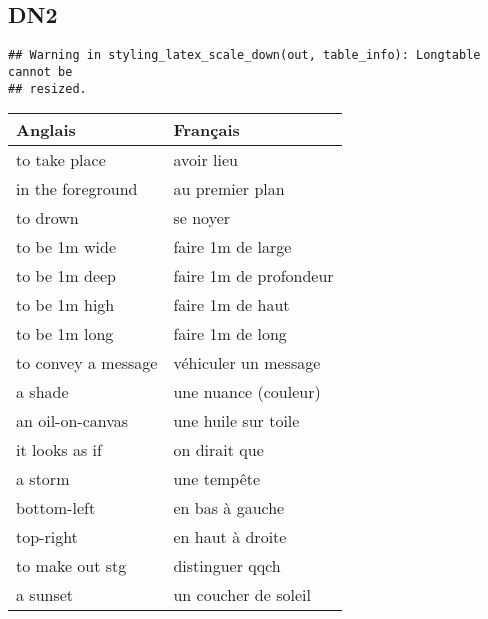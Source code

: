 \documentclass[
  10pt,
]{article}
\begin{document}
\hypertarget{dn2}{%
\subsection{DN2}\label{dn2}}

\begin{verbatim}
## Warning in styling_latex_scale_down(out, table_info): Longtable cannot be
## resized.
\end{verbatim}

\begin{longtable}{ll}
\toprule
Anglais &  Français\\
\midrule
\rowcolor{gray!6}  to take place & avoir lieu\\

in the foreground & au premier plan\\

\rowcolor{gray!6}  to drown & se noyer\\

to be 1m wide & faire 1m de large\\

\rowcolor{gray!6}  to be 1m deep & faire 1m de profondeur\\

to be 1m high & faire 1m de haut\\

\rowcolor{gray!6}  to be 1m long & faire 1m de long\\

to convey a message & véhiculer un message\\

\rowcolor{gray!6}  a shade & une nuance (couleur)\\

an oil-on-canvas & une huile sur toile\\

\rowcolor{gray!6}  it looks as if & on dirait que\\

a storm & une tempête\\

\rowcolor{gray!6}  bottom-left & en bas à gauche\\

top-right & en haut à droite\\

\rowcolor{gray!6}  to make out stg & distinguer qqch\\

a sunset & un coucher de soleil\\
\bottomrule
\end{longtable}
\end{document}
